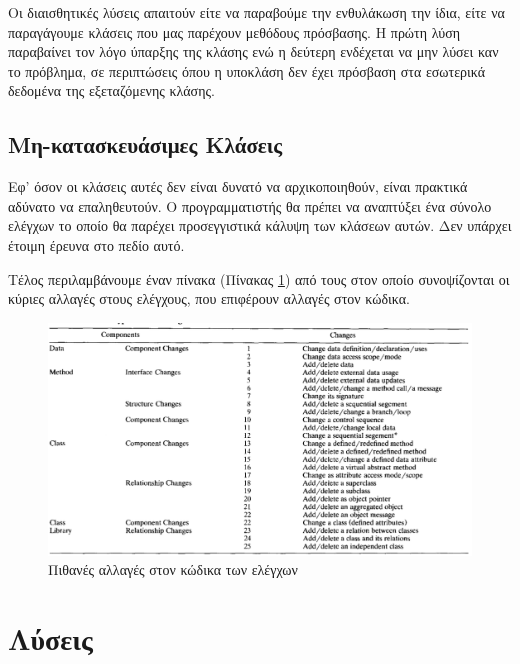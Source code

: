 \documentclass[12pt]{article}
\begin{document}
\par Οι διαισθητικές λύσεις απαιτούν είτε να παραβούμε την ενθυλάκωση την ίδια, είτε να παραγάγουμε κλάσεις που μας παρέχουν μεθόδους πρόσβασης. Η πρώτη λύση παραβαίνει τον λόγο ύπαρξης της κλάσης ενώ η δεύτερη ενδέχεται να μην λύσει καν το πρόβλημα, σε περιπτώσεις όπου η υποκλάση δεν έχει πρόσβαση στα εσωτερικά δεδομένα της εξεταζόμενης κλάσης.

\subsection{Μη-κατασκευάσιμες Κλάσεις}

Εφ' όσον οι κλάσεις αυτές δεν είναι δυνατό να αρχικοποιηθούν, είναι πρακτικά αδύνατο να επαληθευτούν. Ο προγραμματιστής θα πρέπει να αναπτύξει ένα σύνολο ελέγχων το οποίο θα παρέχει προσεγγιστικά κάλυψη των κλάσεων αυτών. Δεν υπάρχει έτοιμη έρευνα στο πεδίο αυτό.

\newline

\par Τέλος περιλαμβάνουμε έναν πίνακα (Πίνακας \ref{fig:panos}) από τους \textcite{kung} στον οποίο συνοψίζονται οι κύριες  αλλαγές στους ελέγχους, που επιφέρουν αλλαγές στον κώδικα.

\begin{figure}
\label{fig:panos}
\caption{Πιθανές αλλαγές στον κώδικα των ελέγχων}
\includegraphics[width=\textwidth,height=\textheight,keepaspectratio]{code_changes_table.PNG}
\end{figure}

\section{Λύσεις}
\end{document}
